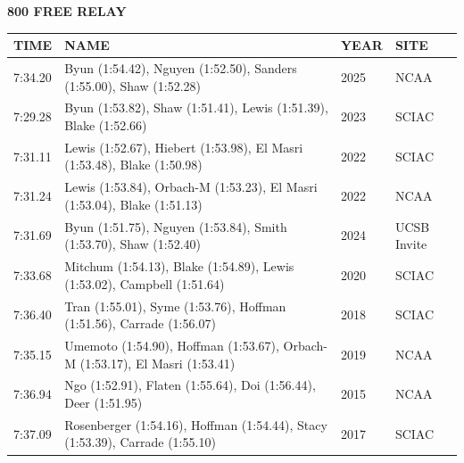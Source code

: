 \begin{table}[H]
\centering
\begin{minipage}[t]{0.6\textwidth}
\centering
\textbf{800 FREE RELAY}\\[0.1cm]
\begin{tabular}{@{}p{1.8cm}p{2.8cm}p{1.2cm}p{1.4cm}@{}}
\hline
    \textbf{TIME} & \textbf{NAME} & \textbf{YEAR} & \textbf{SITE} \\
\hline
    7:34.20 & Byun (1:54.42), Nguyen (1:52.50), Sanders (1:55.00), Shaw (1:52.28) & 2025 & NCAA \\
    7:29.28 & Byun (1:53.82), Shaw (1:51.41), Lewis (1:51.39), Blake (1:52.66) & 2023 & SCIAC \\
    7:31.11 & Lewis (1:52.67), Hiebert (1:53.98), El Masri (1:53.48), Blake (1:50.98) & 2022 & SCIAC \\
    7:31.24 & Lewis (1:53.84), Orbach-M (1:53.23), El Masri (1:53.04), Blake (1:51.13) & 2022 & NCAA \\
    7:31.69 & Byun (1:51.75), Nguyen (1:53.84), Smith (1:53.70), Shaw (1:52.40) & 2024 & UCSB Invite \\
    7:33.68 & Mitchum (1:54.13), Blake (1:54.89), Lewis (1:53.02), Campbell (1:51.64) & 2020 & SCIAC \\
    7:36.40 & Tran (1:55.01), Syme (1:53.76), Hoffman (1:51.56), Carrade (1:56.07) & 2018 & SCIAC \\
    7:35.15 & Umemoto (1:54.90), Hoffman (1:53.67), Orbach-M (1:53.17), El Masri (1:53.41) & 2019 & NCAA \\
    7:36.94 & Ngo (1:52.91), Flaten (1:55.64), Doi (1:56.44), Deer (1:51.95) & 2015 & NCAA \\
    7:37.09 & Rosenberger (1:54.16), Hoffman (1:54.44), Stacy (1:53.39), Carrade (1:55.10) & 2017 & SCIAC \\
\hline
\end{tabular}
\end{minipage}
\end{table}

